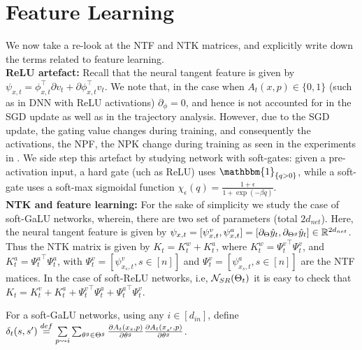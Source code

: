 \section{Feature Learning}
We now take a re-look at the NTF and NTK matrices, and explicitly write down the terms related to feature learning. \hfill\\
\textbf{ReLU artefact:} Recall that the neural tangent feature is given by $\psi_{x,t}=\phi^\top_{x,t} {\partial} v_t + {\partial} \phi^\top_{x,t} v_t$. We note that, in the case when $A_t(x,p)\in\{0,1\}$ (such as in DNN with ReLU activations)  $\partial_{\phi}=0$, and hence is not accounted for in the SGD update as well as in the trajectory analysis. However, due to the SGD update, the gating value changes during training, and consequently the activations, the NPF, the NPK change during training as seen in the experiments in . We side step this artefact by studying network with soft-gates: given a pre-activation input, a hard gate (uch as ReLU) uses $\mathbbm{1}_{\{q>0\}}$, while a soft-gate uses a soft-max sigmoidal function $\chi_\epsilon(q)=\frac{1+\epsilon}{1+\exp(-\beta q)}$.\hfill\\ %
\textbf{NTK and feature learning:} For the sake of simplicity we study the case of  soft-GaLU networks, wherein, there are two set of parameters (total $2d_{net}$). Here, the neural tangent feature is given by $\psi_{x,t}=[\psi^v_{x,t},\psi^a_{x,t}]=[\partial_{\Theta} \hat{y}_t, \partial_{{\Theta}^g} \hat{y}_t]\in \mathbb{R}^{2d_{net}}$. Thus the NTK matrix is given by $K_t=K^w_t+K^a_t$,  where $K^w_t={\Psi^v_t}^\top \Psi^v_t$, and $K^a_t={\Psi^a_t}^\top \Psi^a_t$, with $\Psi^v_t=[\psi^v_{x_s,t},s\in[n]]$ and $\Psi^v_t=[\psi^a_{x_s,t},s\in[n]]$ are the NTF matices. In the case of  soft-ReLU networks, i.e, $\mathcal{N}_{SR}(\Theta_t)$  it is easy to check that $K_t={K^v_t}+{K^a_t}+{\Psi^v_t}^\top {\Psi^a_t}+{\Psi^a_t}^\top {\Psi^v_t}$.
\begin{definition}\label{def:delta}
For a soft-GaLU networks, using any $i\in[d_{in}]$, define $\delta_t(s,s')\stackrel{def}= \underset{{p\rightsquigarrow i}}{\sum} \sum_{\theta^g\in{\Theta}^g}\frac{\partial A_{t}(x_s,p)}{\partial \theta^g} \frac{\partial A_{t}(x_{s'},p)}{\partial \theta^g}$.
\end{definition}
